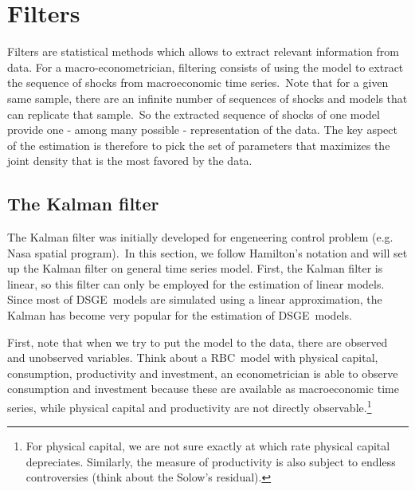 \documentclass[a4paper,12pt]{article}%
\begin{document}
\section{Filters}

Filters are statistical methods which allows to extract relevant information
from data. For a macro-econometrician, filtering consists of using the model
to extract the sequence of shocks from macroeconomic time series.\ Note that
for a given same sample, there are an infinite number of sequences of shocks
and models that can replicate that sample.\ So the extracted sequence of
shocks of one model provide one - among many possible - representation of the
data. The key aspect of the estimation is therefore to pick the set of
parameters that maximizes the joint density that is the most favored by the data.

\subsection{The Kalman filter}

The Kalman filter was initially developed for engeneering control problem
(e.g. Nasa spatial program).\ In this section, we follow Hamilton's notation
and will set up the Kalman filter on general time series model. First, the
Kalman filter is linear, so this filter can only be employed for the
estimation of linear models. Since most of DSGE\ models are simulated using a
linear approximation, the Kalman has become very popular for the estimation of DSGE\ models.

First, note that when we try to put the model to the data, there are observed
and unobserved variables. Think about a RBC\ model with physical capital,
consumption, productivity and investment, an econometrician is able to observe
consumption and investment because these are available as macroeconomic time
series, while physical capital and productivity are not directly
observable.\footnote{For physical capital, we are not sure exactly at which
rate physical capital depreciates. Similarly, the measure of productivity is
also subject to endless controversies (think about the Solow's residual).}
\end{document}

